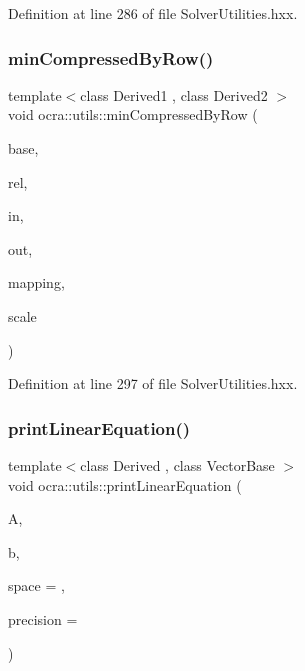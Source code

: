 Definition at line 286 of file Solver\+Utilities.\+hxx.

\hypertarget{namespaceocra_1_1utils_af79aa2317a885467a28ba54e7b287ec8}{}\label{namespaceocra_1_1utils_af79aa2317a885467a28ba54e7b287ec8} 
\subsubsection{\texorpdfstring{min\+Compressed\+By\+Row()}{minCompressedByRow()}\hspace{0.1cm}{\footnotesize\ttfamily [2/2]}}
{\footnotesize\ttfamily template$<$class Derived1 , class Derived2 $>$ \\
void ocra\+::utils\+::min\+Compressed\+By\+Row (\begin{DoxyParamCaption}\item[{const \hyperlink{classocra_1_1Variable}{Variable} \&}]{base,  }\item[{const \hyperlink{classocra_1_1Variable}{Variable} \&}]{rel,  }\item[{const Matrix\+Base$<$ Derived1 $>$ \&}]{in,  }\item[{Matrix\+Base$<$ Derived2 $>$ const \&}]{out,  }\item[{std\+::vector$<$ int $>$ \&}]{mapping,  }\item[{double}]{scale }\end{DoxyParamCaption})\hspace{0.3cm}{\ttfamily [inline]}}



Definition at line 297 of file Solver\+Utilities.\+hxx.

\hypertarget{namespaceocra_1_1utils_aaf649f13f39cd8d32b0311ac2bfe2b4d}{}\label{namespaceocra_1_1utils_aaf649f13f39cd8d32b0311ac2bfe2b4d} 
\subsubsection{\texorpdfstring{print\+Linear\+Equation()}{printLinearEquation()}}
{\footnotesize\ttfamily template$<$class Derived , class Vector\+Base $>$ \\
void ocra\+::utils\+::print\+Linear\+Equation (\begin{DoxyParamCaption}\item[{const Matrix\+Base$<$ Derived $>$ \&}]{A,  }\item[{const Vector\+Base \&}]{b,  }\item[{int}]{space = {},  }\item[{int}]{precision = {} }\end{DoxyParamCaption})\hspace{0.3cm}{\ttfamily [inline]}}

